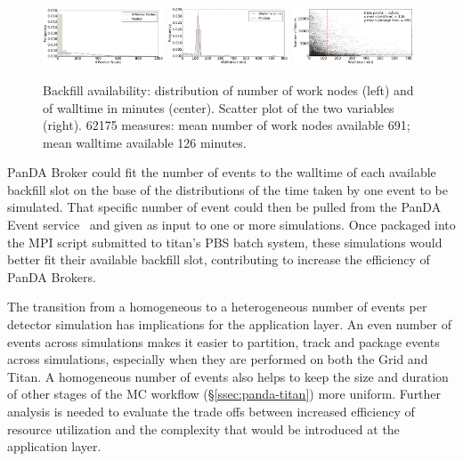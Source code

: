 \documentclass[conference]{IEEEtran}
\begin{document}
\begin{figure}[!t]
    \includegraphics[clip,width=0.32\textwidth]{titan_backfill_wnodes_distribution.pdf}
    \includegraphics[clip,width=0.32\textwidth]{titan_backfill_walltime_distribution.pdf}
    \includegraphics[clip,width=0.32\textwidth]{titan_backfill_avail.png}
    \caption{Backfill availability: distribution of number of work nodes (left)
    and of walltime in minutes (center). Scatter plot of the two variables
    (right). 62175 measures: mean number of work nodes available 691; mean
    walltime available 126 minutes.}
\label{fig:backfill-distrib}
\end{figure}

PanDA Broker could fit the number of events to the walltime of each available
backfill slot on the base of the distributions of the time taken by one event to
be simulated. That specific number of event could then be pulled from the PanDA
Event service~\cite{calafiura2015atlas} and given as input to one or more
simulations. Once packaged into the MPI script submitted to titan's PBS batch
system, these simulations would better fit their available backfill slot,
contributing to increase the efficiency of PanDA Brokers.

The transition from a homogeneous to a heterogeneous number of events per
detector simulation has implications for the application layer. An even number
of events across simulations makes it easier to partition, track and package
events across simulations, especially when they are performed on both the Grid
and Titan. A homogeneous number of events also helps to keep the size and
duration of other stages of the MC workflow (\S\ref{ssec:panda-titan}) more
uniform. Further analysis is needed to evaluate the trade offs between increased
efficiency of resource utilization and the complexity that would be introduced
at the application layer.
\end{document}
